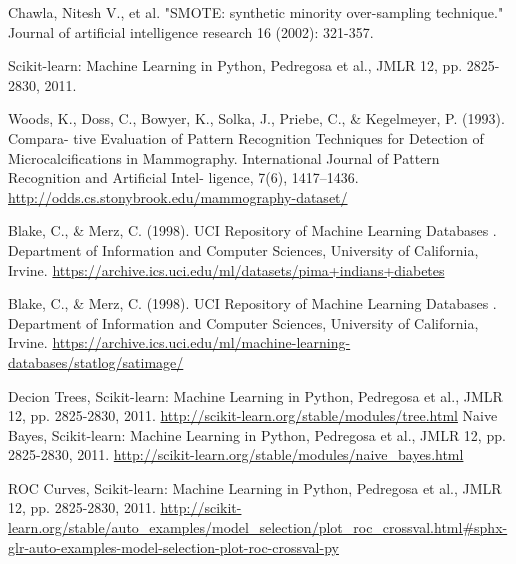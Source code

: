 \documentclass[10pt,journal,compsoc]{IEEEtran}
\begin{document}
%
%
%
\begin{thebibliography}{10}

Chawla, Nitesh V., et al. "SMOTE: synthetic minority over-sampling technique." Journal of artificial intelligence research 16 (2002): 321-357.

Scikit-learn: Machine Learning in Python, Pedregosa et al., JMLR 12, pp. 2825-2830, 2011.

Woods, K., Doss, C., Bowyer, K., Solka, J., Priebe, C., \& Kegelmeyer, P. (1993). Compara- tive Evaluation of Pattern Recognition Techniques for Detection of Microcalcifications in Mammography. International Journal of Pattern Recognition and Artificial Intel- ligence, 7(6), 1417–1436.
\url{http://odds.cs.stonybrook.edu/mammography-dataset/}

Blake, C., \& Merz, C. (1998). UCI Repository of Machine Learning Databases . Department of Information and Computer Sciences, University of California, Irvine.
\url{https://archive.ics.uci.edu/ml/datasets/pima+indians+diabetes}

Blake, C., \& Merz, C. (1998). UCI Repository of Machine Learning Databases . Department of Information and Computer Sciences, University of California, Irvine.
\url{https://archive.ics.uci.edu/ml/machine-learning-databases/statlog/satimage/}

Decion Trees, Scikit-learn: Machine Learning in Python, Pedregosa et al., JMLR 12, pp. 2825-2830, 2011.
\url{http://scikit-learn.org/stable/modules/tree.html}
Naive Bayes, Scikit-learn: Machine Learning in Python, Pedregosa et al., JMLR 12, pp. 2825-2830, 2011.
\url{http://scikit-learn.org/stable/modules/naive_bayes.html}


ROC Curves, Scikit-learn: Machine Learning in Python, Pedregosa et al., JMLR 12, pp. 2825-2830, 2011.
\url{http://scikit-learn.org/stable/auto_examples/model_selection/plot_roc_crossval.html#sphx-glr-auto-examples-model-selection-plot-roc-crossval-py}


\end{thebibliography}
\end{document}
